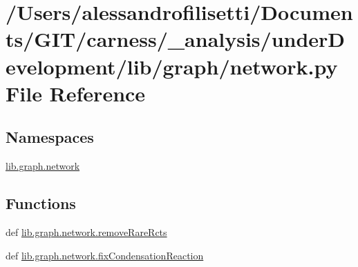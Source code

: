 \hypertarget{a00054}{\section{/\-Users/alessandrofilisetti/\-Documents/\-G\-I\-T/carness/\-\_\-analysis/under\-Development/lib/graph/network.py File Reference}
\label{a00054}
}
\subsection*{Namespaces}
\begin{DoxyCompactItemize}
\item 
\hyperlink{a00112}{lib.\-graph.\-network}
\end{DoxyCompactItemize}
\subsection*{Functions}
\begin{DoxyCompactItemize}
\item 
def \hyperlink{a00112_aa023644e6dad3ed7be55a592d8576007}{lib.\-graph.\-network.\-remove\-Rare\-Rcts}
\item 
def \hyperlink{a00112_a31099e87728bb8b899360bb641bb6b64}{lib.\-graph.\-network.\-fix\-Condensation\-Reaction}
\end{DoxyCompactItemize}
